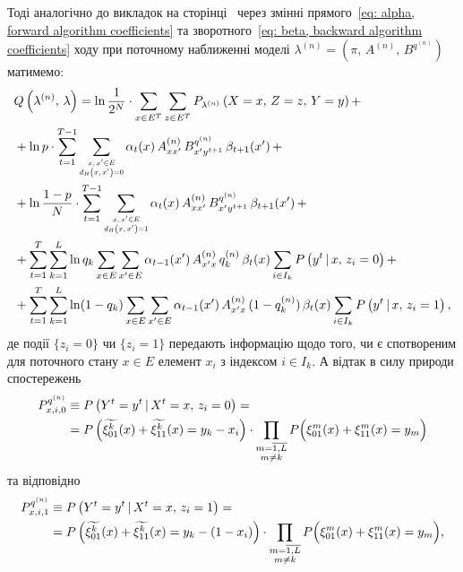 Тоді аналогічно до викладок на сторінці~\pageref{eq: conditional probability} через змінні прямого~\eqref{eq: alpha, forward algorithm coefficients} та зворотного~\eqref{eq: beta, backward algorithm coefficients} ходу при поточному наближенні моделі $\lambda^{(n)}=(\pi,\,A^{(n)},\,B^{q^{(n)}})$ матимемо:
\begin{align*}
    &Q\left( \lambda^{(n)},\,\lambda \right) = \ln \frac{1}{2^N} \cdot \sum\limits_{x \in E^T} \sum\limits_{z \in E^T} P_{\lambda^{(n)}} \left( X=x,\,Z=z,\,Y=y \right) + \\
    &+ \ln p \cdot \sum\limits_{t=1}^{T-1} \sum\limits_{\scaleq[0.8]{\substack{x,\,x' \in E \\ d_H\left( x,\,x' \right) = 0}}} \alpha_t(x)\,A^{(n)}_{xx'}\,B^{q^{(n)}}_{x'y^{t+1}}\,\beta_{t+1}(x')\, + \\ 
    &+ \ln \frac{1-p}{N} \cdot \sum\limits_{t=1}^{T-1} \sum\limits_{\scaleq[0.8]{\substack{x,\,x' \in E \\ d_H\left( x,\,x' \right) = 1}}} \alpha_t(x)\,A^{(n)}_{xx'}\,B^{q^{(n)}}_{x'y^{t+1}}\,\beta_{t+1}(x')\, + \\
    &+ \sum\limits_{t=1}^T \sum\limits_{k=1}^L \ln{q_k} \sum\limits_{x \in E} \sum\limits_{x' \in E} \alpha_{t-1}(x')\,A^{(n)}_{x'x}\, q^{(n)}_k\, \beta_t(x) \sum\limits_{i \in I_k} P\left( y^t \,|\, x,\,z_i=0 \right) + \\
    &+ \sum\limits_{t=1}^T \sum\limits_{k=1}^L \ln(1-q_k) \sum\limits_{x \in E} \sum\limits_{x' \in E} \alpha_{t-1}(x')\,A^{(n)}_{x'x}\, (1-q^{(n)}_k)\, \beta_t(x) \sum\limits_{i \in I_k} P\left( y^t \,|\, x,\,z_i=1 \right),
\end{align*}
де події $\{ z_i=0 \}$ чи $\{ z_i=1 \}$ передають інформацію щодо того, чи є спотвореним для поточного стану $x \in E$ елемент $x_i$ з індексом $i \in I_k$. А відтак в силу природи спостережень 
\begin{align*}
    P^{q^{(n)}}_{x,i,0} &\equiv P\left( Y^t=y^t \,|\, X^t=x,\,z_i=0 \right) = \\ 
    &= P\left( \widetilde{\xi^k_{01}}(x) + \widetilde{\xi^k_{11}}(x) = y_k - x_i \right) \cdot \prod\limits_{\substack{m = \overline{1,L} \\ m \neq k}} P\Bigl( \xi^m_{01}(x) + \xi^m_{11}(x) = y_m \Bigr)
\end{align*}
та відповідно
\begin{align*}
    P^{q^{(n)}}_{x,i,1} &\equiv P\left( Y^t=y^t \,|\, X^t=x,\,z_i=1 \right) = \\ 
    &= P\left( \widetilde{\xi^k_{01}}(x) + \widetilde{\xi^k_{11}}(x) = y_k - (1 - x_i) \right) \cdot  \prod\limits_{\substack{m = \overline{1,L} \\ m \neq k}} P\Bigl( \xi^m_{01}(x) + \xi^m_{11}(x) = y_m \Bigr),
\end{align*}

